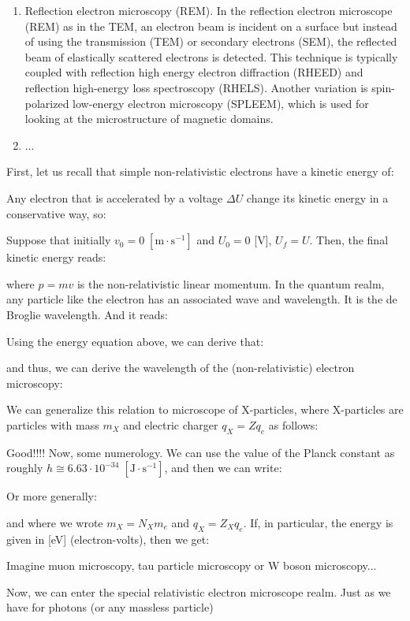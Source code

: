 \begin{enumerate}
		\item Reflection electron microscopy (REM). In the reflection electron microscope (REM) as in the TEM, an electron beam is incident on a surface but instead of using the transmission (TEM) or secondary electrons (SEM), the reflected beam of elastically scattered electrons is detected. This technique is typically coupled with reflection high energy electron diffraction (RHEED) and reflection high-energy loss spectroscopy (RHELS). Another variation is spin-polarized low-energy electron microscopy (SPLEEM), which is used for looking at the microstructure of magnetic domains.
		
		\item ...
	\end{enumerate}
	First, let us recall that simple non-relativistic electrons have a kinetic energy of:
	
	Any electron that is accelerated by a voltage $\Delta U$ change its kinetic energy in a conservative way, so:
	
	Suppose that initially $v_0=0\;[\text{m}\cdot \text{s}^{-1}]$ and $U_0=0$ [V], $U_f=U$. Then, the final kinetic energy reads:
	
	where $p=mv$ is the non-relativistic linear momentum. In the quantum realm, any particle like the electron has an associated wave and wavelength. It is the de Broglie wavelength. And it reads:
	
	Using the energy equation above, we can derive that:
	
	and thus, we can derive the wavelength of the (non-relativistic) electron microscopy:
	
	We can generalize this relation to microscope of X-particles, where X-particles are particles with mass $m_X$ and electric charger $q_X=Zq_e$ as follows:
	
	Good!!!! Now, some numerology. We can use the value of the Planck constant as roughly $h\cong 6.63\cdot 10^{-34}\; [\text{J}\cdot \text{s}^{-1}]$, and then we can write:
	
	Or more generally:
	
	and where we wrote $m_X=N_Xm_e$ and $q_X=Z_Xq_e$. If, in particular, the energy is given in [eV] (electron-volts), then we get:
	
	Imagine muon microscopy, tau particle microscopy or W boson microscopy...
	
	Now, we can enter the special relativistic electron microscope realm. Just as we have for photons (or any massless particle)
	
